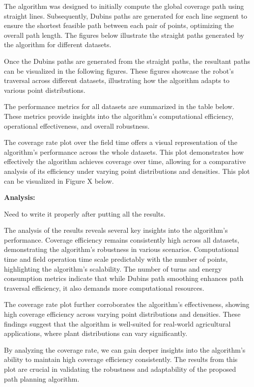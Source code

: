 \vspace*{6mm}

The algorithm was designed to initially compute the global coverage path using straight lines. Subsequently, Dubins paths are generated for each line segment to ensure the shortest feasible path between each pair of points, optimizing the overall path length. The figures below illustrate the straight paths generated by the algorithm for different datasets.


\vspace*{6mm}


Once the Dubins paths are generated from the straight paths, the resultant paths can be visualized in the following figures. These figures showcase the robot's traversal across different datasets, illustrating how the algorithm adapts to various point distributions.

\vspace*{6mm}

The performance metrics for all datasets are summarized in the table below. These metrics provide insights into the algorithm's computational efficiency, operational effectiveness, and overall robustness.

\vspace*{6mm}


The coverage rate plot over the field time offers a visual representation of the algorithm's performance across the whole datasets. This plot demonstrates how effectively the algorithm achieves coverage over time, allowing for a comparative analysis of its efficiency under varying point distributions and densities. This plot can be visualized in Figure X below. 

\textbf{Analysis: }

Need to write it properly after putting all the results.  

The analysis of the results reveals several key insights into the algorithm's performance. Coverage efficiency remains consistently high across all datasets, demonstrating the algorithm's robustness in various scenarios. Computational time and field operation time scale predictably with the number of points, highlighting the algorithm's scalability. The number of turns and energy consumption metrics indicate that while Dubins path smoothing enhances path traversal efficiency, it also demands more computational resources.

\vspace*{6mm}

The coverage rate plot further corroborates the algorithm's effectiveness, showing high coverage efficiency across varying point distributions and densities. These findings suggest that the algorithm is well-suited for real-world agricultural applications, where plant distributions can vary significantly.

\vspace*{6mm} 


By analyzing the coverage rate, we can gain deeper insights into the algorithm's ability to maintain high coverage efficiency consistently. The results from this plot are crucial in validating the robustness and adaptability of the proposed path planning algorithm. 